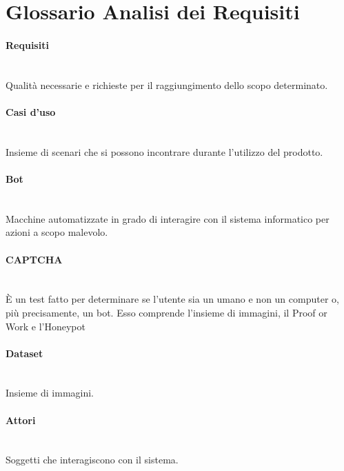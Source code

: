 \section{Glossario Analisi dei Requisiti}

\paragraph{Requisiti}~\smallskip \\
Qualità necessarie e richieste per il raggiungimento dello scopo determinato.

\paragraph{Casi d'uso}~\smallskip \\
Insieme di scenari che si possono incontrare durante l'utilizzo del prodotto.

\paragraph{Bot}~\smallskip \\
Macchine automatizzate in grado di interagire con il sistema informatico per azioni a scopo malevolo.

\paragraph{CAPTCHA}~\smallskip \\
È un test fatto per determinare se l'utente sia un umano e non un computer o, più precisamente, un bot.
Esso comprende l'insieme di immagini, il Proof or Work e l'Honeypot

\paragraph{Dataset}~\smallskip \\
Insieme di immagini.

\paragraph{Attori}~\smallskip \\
Soggetti che interagiscono con il sistema.

